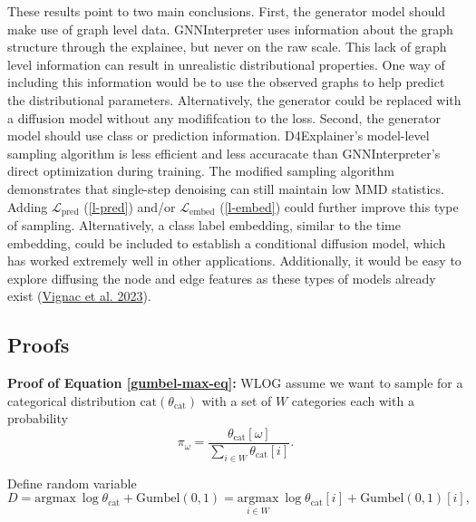 \documentclass[
  11pt,
  letterpaper,
]{article}
\begin{document}
\quad These results point to two main conclusions. First, the generator
model should make use of graph level data. GNNInterpreter uses
information about the graph structure through the explainee, but never
on the raw scale. This lack of graph level information can result in
unrealistic distributional properties. One way of including this
information would be to use the observed graphs to help predict the
distributional parameters. Alternatively, the generator could be
replaced with a diffusion model without any modififcation to the loss.
Second, the generator model should use class or prediction information.
D4Explainer's model-level sampling algorithm is less efficient and less
accuracate than GNNInterpreter's direct optimization during training.
The modified sampling algorithm demonstrates that single-step denoising
can still maintain low MMD statistics. Adding
\(\mathcal{L}_\text{pred}\) (\ref{l-pred}) and/or
\(\mathcal{L}_\text{embed}\) (\ref{l-embed}) could further improve this
type of sampling. Alternatively, a class label embedding, similar to the
time embedding, could be included to establish a conditional diffusion
model, which has worked extremely well in other applications.
Additionally, it would be easy to explore diffusing the node and edge
features as these types of models already exist
(\protect\hyperlink{ref-Vignac_Krawczuk_Siraudin_Wang_Cevher_Frossard_2023}{Vignac
et al. 2023}).

\hypertarget{sec-proof}{%
\subsection{Proofs}\label{sec-proof}}

\textbf{Proof of Equation \ref{gumbel-max-eq}:} WLOG assume we want to
sample for a categorical distribution \(\text{cat}(\theta_\text{cat})\)
with a set of \(W\) categories each with a probability \[
\pi_\omega = \dfrac{\theta_\text{cat}[\omega]}{\sum_{i \in W}\theta_\text{cat}[i]}.
\]

Define random variable \[
D = \text{argmax} \ \log \theta_\text{cat} + \text{Gumbel}(0, 1) = \underset{i \in W}{\text{argmax}} \ \log \theta_\text{cat}[i] + \text{Gumbel}(0, 1)[i], 
\]
\end{document}
